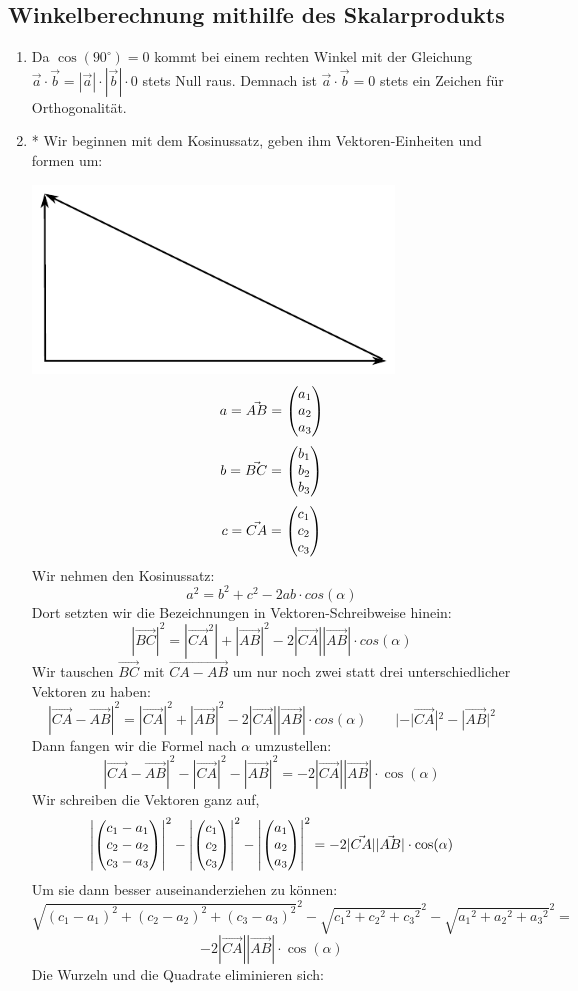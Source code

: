 \subsection{Winkelberechnung mithilfe des Skalarprodukts}
	\begin{enumerate}
		\item Da $\cos(90^\circ)=0$ kommt bei einem rechten Winkel mit der Gleichung $\vec{a}\cdot\vec{b}=|\vec{a}|\cdot|\vec{b}|\cdot0 $ stets Null raus. Demnach ist $\vec{a}\cdot\vec{b} = 0$ stets ein Zeichen für Orthogonalität.

		\item * Wir beginnen mit dem Kosinussatz, geben ihm Vektoren-Einheiten und formen um:
		
		{\includegraphics [keepaspectratio,height=5cm]{pics/Dreieck}}
		$$a=\vec{AB}=\begin{pmatrix} a_1 \\ a_2 \\ a_3 \end{pmatrix}$$			$$b=\vec{BC}=\begin{pmatrix} b_1 \\ b_2 \\ b_3 \end{pmatrix}$$
		$$c=\vec{CA}=\begin{pmatrix} c_1 \\ c_2 \\ c_3 \end{pmatrix}$$\newline\newline
Wir nehmen den Kosinussatz:				
		$$ a^2=b^2+c^2-2ab\cdot cos(\alpha)$$
Dort setzten wir die Bezeichnungen in Vektoren-Schreibweise hinein:	
		$$ |\vec{BC}|^2=|\vec{CA}^2|+|\vec{AB}|^2-2|\vec{CA}||\vec{AB}|\cdot cos(\alpha) $$
Wir tauschen $\vec{BC}$ mit $\vec{CA-AB}$ um nur noch zwei statt drei unterschiedlicher Vektoren zu haben:	
		$$|\vec{CA}-\vec{AB}|^2=|\vec{CA}|^2+|\vec{AB}|^2-2|\vec{CA}||\vec{AB}|\cdot cos(\alpha) \qquad |-|\vec{CA}|^2-|\vec{AB}|^2 $$
Dann fangen wir die Formel nach $\alpha$ umzustellen:	
		$$|\vec{CA}-\vec{AB}|^2-|\vec{CA}|^2-|\vec{AB}|^2=-2|\vec{CA}||\vec{AB}|\cdot \cos(\alpha) $$
Wir schreiben die Vektoren ganz auf,	
		$$\left|\begin{pmatrix} c_1-a_1 \\ c_2-a_2 \\ c_3-a_3 \end{pmatrix}\right|^2-\left|\begin{pmatrix} c_1 \\ c_2 \\ c_3 \end{pmatrix}\right|^2-\left|\begin{pmatrix} a_1 \\ a_2 \\ a_3 \end{pmatrix}\right|^2=-2|\vec{CA}||\vec{AB}| \cdot \cos(\alpha) $$
Um sie dann besser auseinanderziehen zu können:	
		$$\sqrt{(c_1-a_1)^2+(c_2-a_2)^2+(c_3-a_3)^2}^2-\sqrt{{c_1}^2+{c_2}^2+{c_3}^2}^2-\sqrt{{a_1}^2+{a_2}^2+{a_3}^2}^2=$$
		$$-2|\vec{CA}||\vec{AB}|\cdot \cos(\alpha) $$
Die Wurzeln und die Quadrate eliminieren sich:	

\end{enumerate}
